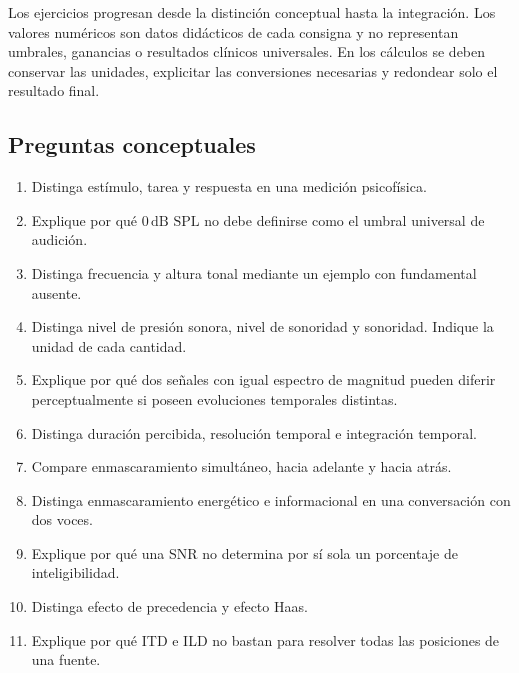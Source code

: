 Los ejercicios progresan desde la distinción conceptual hasta la integración.
Los valores numéricos son datos didácticos de cada consigna y no representan
umbrales, ganancias o resultados clínicos universales. En los cálculos se
deben conservar las unidades, explicitar las conversiones necesarias y
redondear solo el resultado final.

\subsection*{Preguntas conceptuales}

\begin{enumerate}[label=\textbf{C\arabic*.},leftmargin=*]
    \item Distinga estímulo, tarea y respuesta en una medición psicofísica.

    \item Explique por qué \(0\,\text{dB SPL}\) no debe definirse como el
    umbral universal de audición.

    \item Distinga frecuencia y altura tonal mediante un ejemplo con
    fundamental ausente.

    \item Distinga nivel de presión sonora, nivel de sonoridad y sonoridad.
    Indique la unidad de cada cantidad.

    \item Explique por qué dos señales con igual espectro de magnitud pueden
    diferir perceptualmente si poseen evoluciones temporales distintas.

    \item Distinga duración percibida, resolución temporal e integración
    temporal.

    \item Compare enmascaramiento simultáneo, hacia adelante y hacia atrás.

    \item Distinga enmascaramiento energético e informacional en una
    conversación con dos voces.

    \item Explique por qué una SNR no determina por sí sola un porcentaje de
    inteligibilidad.

    \item Distinga efecto de precedencia y efecto Haas.

    \item Explique por qué ITD e ILD no bastan para resolver todas las
    posiciones de una fuente.
\end{enumerate}

